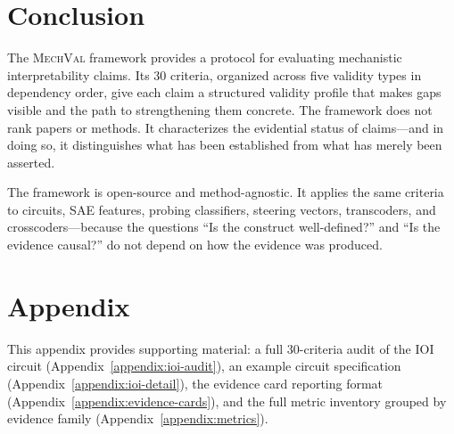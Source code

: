 \documentclass[10pt]{article}
\newcommand{\mechval}{\textsc{MechVal}}
\begin{document}
\section{Conclusion}
\label{sec:conclusion}

The \mechval{} framework provides a protocol for evaluating mechanistic interpretability claims. Its 30 criteria, organized across five validity types in dependency order, give each claim a structured validity profile that makes gaps visible and the path to strengthening them concrete. The framework does not rank papers or methods. It characterizes the evidential status of claims---and in doing so, it distinguishes what has been established from what has merely been asserted.

The framework is open-source and method-agnostic. It applies the same criteria to circuits, SAE features, probing classifiers, steering vectors, transcoders, and crosscoders---because the questions ``Is the construct well-defined?'' and ``Is the evidence causal?'' do not depend on how the evidence was produced.

%
%



\nocite{campbell1963experimental,loevinger1957objective}



\clearpage
\appendix
\section{Appendix}

This appendix provides supporting material: a full 30-criteria audit of the IOI circuit
(Appendix~\ref{appendix:ioi-audit}), an example circuit specification
(Appendix~\ref{appendix:ioi-detail}), the evidence card reporting format
(Appendix~\ref{appendix:evidence-cards}), and the full metric inventory grouped by
evidence family (Appendix~\ref{appendix:metrics}).
\end{document}
